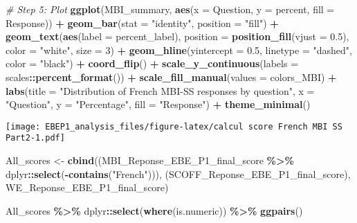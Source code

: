 \documentclass[
]{article}
\newenvironment{Shaded}{\begin{snugshade}}{\end{snugshade}}
\newcommand{\AttributeTok}[1]{\textcolor[rgb]{0.13,0.29,0.53}{#1}}
\newcommand{\CommentTok}[1]{\textcolor[rgb]{0.56,0.35,0.01}{\textit{#1}}}
\newcommand{\DecValTok}[1]{\textcolor[rgb]{0.00,0.00,0.81}{#1}}
\newcommand{\FloatTok}[1]{\textcolor[rgb]{0.00,0.00,0.81}{#1}}
\newcommand{\FunctionTok}[1]{\textcolor[rgb]{0.13,0.29,0.53}{\textbf{#1}}}
\newcommand{\NormalTok}[1]{#1}
\newcommand{\OtherTok}[1]{\textcolor[rgb]{0.56,0.35,0.01}{#1}}
\newcommand{\SpecialCharTok}[1]{\textcolor[rgb]{0.81,0.36,0.00}{\textbf{#1}}}
\newcommand{\StringTok}[1]{\textcolor[rgb]{0.31,0.60,0.02}{#1}}
\begin{document}
\begin{Shaded}
\begin{Highlighting}[]
\CommentTok{\# Step 5: Plot}
\FunctionTok{ggplot}\NormalTok{(MBI\_summary, }\FunctionTok{aes}\NormalTok{(}\AttributeTok{x =}\NormalTok{ Question, }\AttributeTok{y =}\NormalTok{ percent, }\AttributeTok{fill =}\NormalTok{ Response)) }\SpecialCharTok{+}
  \FunctionTok{geom\_bar}\NormalTok{(}\AttributeTok{stat =} \StringTok{"identity"}\NormalTok{, }\AttributeTok{position =} \StringTok{"fill"}\NormalTok{) }\SpecialCharTok{+}
  \FunctionTok{geom\_text}\NormalTok{(}\FunctionTok{aes}\NormalTok{(}\AttributeTok{label =}\NormalTok{ percent\_label),}
            \AttributeTok{position =} \FunctionTok{position\_fill}\NormalTok{(}\AttributeTok{vjust =} \FloatTok{0.5}\NormalTok{),}
            \AttributeTok{color =} \StringTok{"white"}\NormalTok{,}
            \AttributeTok{size =} \DecValTok{3}\NormalTok{) }\SpecialCharTok{+}
  \FunctionTok{geom\_hline}\NormalTok{(}\AttributeTok{yintercept =} \FloatTok{0.5}\NormalTok{, }\AttributeTok{linetype =} \StringTok{"dashed"}\NormalTok{, }\AttributeTok{color =} \StringTok{"black"}\NormalTok{) }\SpecialCharTok{+}
  \FunctionTok{coord\_flip}\NormalTok{() }\SpecialCharTok{+}
  \FunctionTok{scale\_y\_continuous}\NormalTok{(}\AttributeTok{labels =}\NormalTok{ scales}\SpecialCharTok{::}\FunctionTok{percent\_format}\NormalTok{()) }\SpecialCharTok{+}
  \FunctionTok{scale\_fill\_manual}\NormalTok{(}\AttributeTok{values =}\NormalTok{ colors\_MBI) }\SpecialCharTok{+}
  \FunctionTok{labs}\NormalTok{(}\AttributeTok{title =} \StringTok{"Distribution of French MBI{-}SS responses by question"}\NormalTok{,}
       \AttributeTok{x =} \StringTok{"Question"}\NormalTok{,}
       \AttributeTok{y =} \StringTok{"Percentage"}\NormalTok{,}
       \AttributeTok{fill =} \StringTok{"Response"}\NormalTok{) }\SpecialCharTok{+}
  \FunctionTok{theme\_minimal}\NormalTok{()}
\end{Highlighting}
\end{Shaded}

\texttt{[image: EBEP1\_analysis\_files/figure-latex/calcul score French MBI SS Part2-1.pdf]}

\begin{Shaded}
\begin{Highlighting}[]
\NormalTok{All\_scores }\OtherTok{\textless{}{-}}
  \FunctionTok{cbind}\NormalTok{((MBI\_Reponse\_EBE\_P1\_final\_score }\SpecialCharTok{\%\textgreater{}\%}
\NormalTok{          dplyr}\SpecialCharTok{::}\FunctionTok{select}\NormalTok{(}\SpecialCharTok{{-}}\FunctionTok{contains}\NormalTok{(}\StringTok{"French"}\NormalTok{))), }
\NormalTok{       (SCOFF\_Reponse\_EBE\_P1\_final\_score),}
\NormalTok{       WE\_Reponse\_EBE\_P1\_final\_score)}


\NormalTok{All\_scores }\SpecialCharTok{\%\textgreater{}\%}\NormalTok{ dplyr}\SpecialCharTok{::}\FunctionTok{select}\NormalTok{(}\FunctionTok{where}\NormalTok{(is.numeric)) }\SpecialCharTok{\%\textgreater{}\%} \FunctionTok{ggpairs}\NormalTok{()}
\end{Highlighting}
\end{Shaded}
\end{document}
